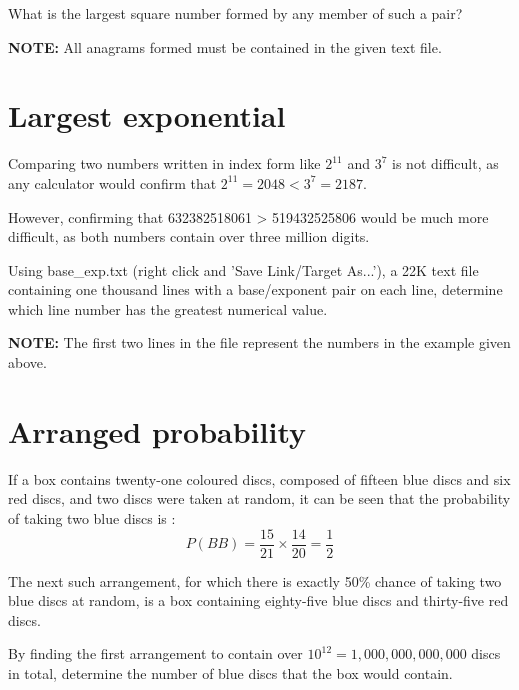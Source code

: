 What is the largest square number formed by any member of such a pair?

\textbf{NOTE:} All anagrams formed must be contained in the given text file.

\section{Largest exponential} \label{pb.099}

Comparing two numbers written in index form like $2^{11}$ and $3^7$ is not difficult, as any calculator would confirm that $2^{11} = 2048 < 3^7 = 2187$.

However, confirming that 632382518061 > 519432525806 would be much more difficult, as both numbers contain over three million digits.

Using base\_exp.txt (right click and 'Save Link/Target As...'), a 22K text file containing one thousand lines with a base/exponent pair on each line, determine which line number has the greatest numerical value.

\textbf{NOTE:} The first two lines in the file represent the numbers in the example given above.

\section{Arranged probability} \label{pb.100}

If a box contains twenty-one coloured discs, composed of fifteen blue discs and six red discs, and two discs were taken at random, it can be seen that the probability of taking two blue discs is :
$$P(BB) = \frac{15}{21} \times \frac{14}{20} = \frac{1}{2}$$

The next such arrangement, for which there is exactly 50\% chance of taking two blue discs at random, is a box containing eighty-five blue discs and thirty-five red discs.

By finding the first arrangement to contain over $10^{12} = 1,000,000,000,000$ discs in total, determine the number of blue discs that the box would contain.
